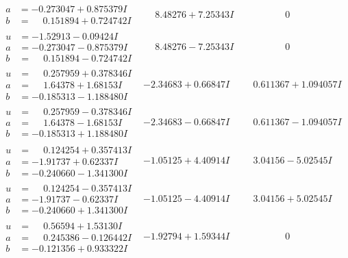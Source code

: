 \documentclass[1p]{elsarticle_modified}
\theoremstyle{definition}
\begin{document}
$$\begin{array}{c|c|c}
\begin{aligned}
a &= -0.273047 + 0.875379 I \\
b &= \phantom{-}0.151894 + 0.724742 I\end{aligned}
 & \phantom{-}8.48276 + 7.25343 I & \phantom{-0.000000 } 0 \\ \hline\begin{aligned}
u &= -1.52913 - 0.09424 I \\
a &= -0.273047 - 0.875379 I \\
b &= \phantom{-}0.151894 - 0.724742 I\end{aligned}
 & \phantom{-}8.48276 - 7.25343 I & \phantom{-0.000000 } 0 \\ \hline\begin{aligned}
u &= \phantom{-}0.257959 + 0.378346 I \\
a &= \phantom{-}1.64378 + 1.68153 I \\
b &= -0.185313 - 1.188480 I\end{aligned}
 & -2.34683 + 0.66847 I & \phantom{-}0.611367 + 1.094057 I \\ \hline\begin{aligned}
u &= \phantom{-}0.257959 - 0.378346 I \\
a &= \phantom{-}1.64378 - 1.68153 I \\
b &= -0.185313 + 1.188480 I\end{aligned}
 & -2.34683 - 0.66847 I & \phantom{-}0.611367 - 1.094057 I \\ \hline\begin{aligned}
u &= \phantom{-}0.124254 + 0.357413 I \\
a &= -1.91737 + 0.62337 I \\
b &= -0.240660 - 1.341300 I\end{aligned}
 & -1.05125 + 4.40914 I & \phantom{-}3.04156 - 5.02545 I \\ \hline\begin{aligned}
u &= \phantom{-}0.124254 - 0.357413 I \\
a &= -1.91737 - 0.62337 I \\
b &= -0.240660 + 1.341300 I\end{aligned}
 & -1.05125 - 4.40914 I & \phantom{-}3.04156 + 5.02545 I \\ \hline\begin{aligned}
u &= \phantom{-}0.56594 + 1.53130 I \\
a &= \phantom{-}0.245386 - 0.126442 I \\
b &= -0.121356 + 0.933322 I\end{aligned}
 & -1.92794 + 1.59344 I & \phantom{-0.000000 } 0\\

\end{array}$$
\end{document}
